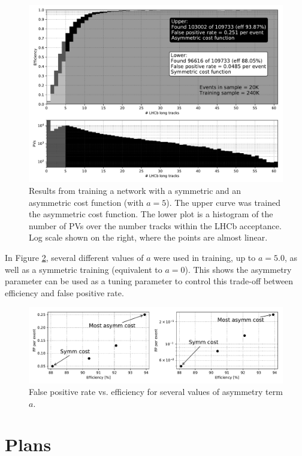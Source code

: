 \documentclass[a4paper]{jpconf}
\begin{document}
\begin{figure}
	\centering
	\includegraphics[width=\textwidth]{images/effntrackspaper.pdf}
	\caption{Results from training a network with a symmetric and an asymmetric cost function (with $a=5$). The upper curve was trained the asymmetric cost function. The lower plot is a histogram of the number of PVs over the number tracks within the LHCb acceptance. Log scale shown on the right, where the points are almost linear.}
    \label{fig:results}
\end{figure}

In Figure \ref{fig:efffp}, several different values of $a$ were used in training, up to $a=5.0$, as well as a symmetric training (equivalent to $a=0$). This shows the asymmetry parameter can be used as a tuning parameter to control this trade-off between efficiency and false positive rate.

\begin{figure}
	\centering
	\includegraphics[width=.8\textwidth]{images/EffVsFP2paper.pdf}
	\caption{False positive rate vs. efficiency for several values of asymmetry term $a$.}
	\label{fig:efffp}
\end{figure}

\section{Plans}
\end{document}
